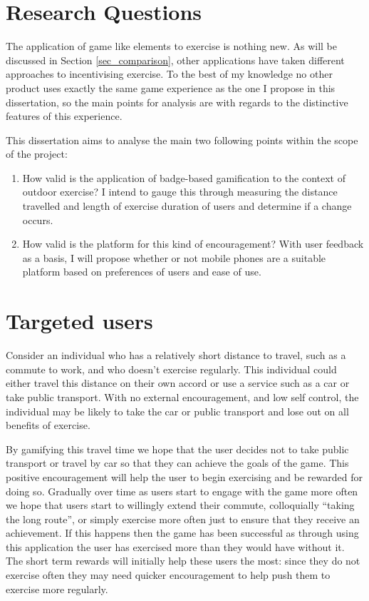 \section{Research Questions}

The application of game like elements to exercise is nothing new. As
will be
discussed in Section \ref{sec_comparison}, other applications have
taken different approaches to incentivising exercise. To the best of
my knowledge no other product uses exactly the same game experience as
the one I propose in this dissertation, so the main points for
analysis are with regards to the distinctive features of this
experience. 

This dissertation aims to analyse the main two following points within
the scope of the project:

\begin{enumerate}
  \item How valid is the application of badge-based gamification to
    the context of outdoor exercise? I intend to gauge this through
    measuring the distance travelled and length of exercise duration
    of users and determine if a change occurs.
  \item How valid is the platform for this kind of encouragement?
    With user feedback as a basis, I will propose whether or not
    mobile phones are a suitable platform based on preferences of
    users and ease of use.
\end{enumerate}


\section{Targeted users}
\label{sec:targeted_users}
Consider an individual who has a relatively short distance to travel,
such as a commute to work,
and who doesn't exercise regularly. This individual could either
travel this distance on their own accord or use a service such as a
car or take public transport. With no external encouragement, and low
self control, the individual may be likely to take the car or public
transport and lose out on all benefits of exercise. 

By gamifying this travel time we hope that the user decides not to
take public transport or travel by car so that they can achieve the
goals of the game. This positive encouragement will help the user to
begin exercising and be rewarded for doing so. Gradually over time as
users start to engage with the game more often we hope that users
start to willingly extend their commute, colloquially ``taking the
long route'', or simply exercise more often just to ensure that they
receive an achievement. If this happens then the game has been
successful as through using this application the user has exercised
more than they would have without it. The short term rewards will
initially help these users the most: since they do not exercise
often they may need quicker encouragement to help push them to
exercise more regularly.

